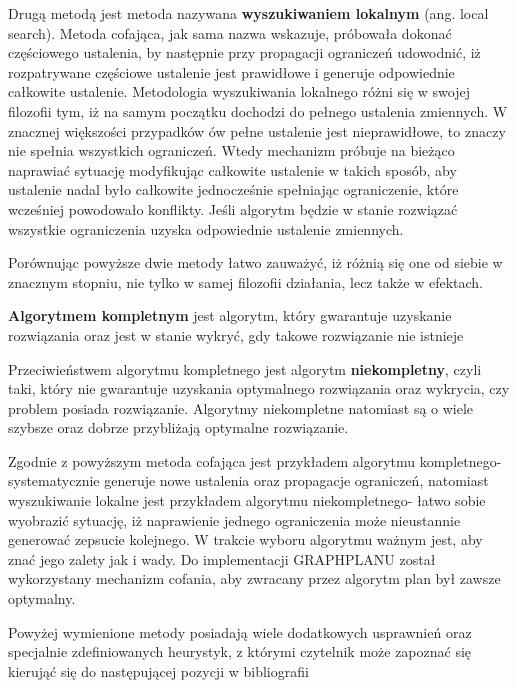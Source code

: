     Drugą metodą jest metoda nazywana \textbf{wyszukiwaniem lokalnym} (ang. local search). Metoda cofająca, jak sama nazwa wskazuje, próbowała dokonać 
    częściowego ustalenia, by następnie przy propagacji ograniczeń udowodnić, iż rozpatrywane częściowe ustalenie jest prawidłowe 
    i generuje odpowiednie całkowite ustalenie. Metodologia wyszukiwania lokalnego różni się w swojej filozofii tym, iż na samym 
    początku dochodzi do pełnego ustalenia zmiennych. W znacznej większości przypadków ów pełne ustalenie jest 
    nieprawidłowe, to znaczy nie spełnia wszystkich ograniczeń. Wtedy mechanizm próbuje na bieżąco naprawiać sytuację modyfikując całkowite ustalenie w takich 
    sposób, aby ustalenie nadal było całkowite jednocześnie spełniając ograniczenie, które wcześniej powodowało konflikty. Jeśli algorytm będzie w stanie 
    rozwiązać wszystkie ograniczenia uzyska odpowiednie ustalenie zmiennych.

    Porównując powyższe dwie metody łatwo zauważyć, iż różnią się one od siebie w znacznym stopniu, nie tylko w samej filozofii działania, lecz także 
    w efektach.

    \begin{definition}
        \label{AlgorytmKompletny}
        \textbf{Algorytmem kompletnym} jest algorytm, który gwarantuje uzyskanie rozwiązania oraz jest w stanie 
        wykryć, gdy takowe rozwiązanie nie istnieje
    \end{definition}

    Przeciwieństwem algorytmu kompletnego jest algorytm \textbf{niekompletny}, czyli taki, który nie gwarantuje 
    uzyskania optymalnego rozwiązania oraz wykrycia, czy problem posiada rozwiązanie. Algorytmy niekompletne natomiast są o wiele 
    szybsze oraz dobrze przybliżają optymalne rozwiązanie. 

    Zgodnie z powyższym metoda cofająca jest przykładem algorytmu kompletnego- systematycznie generuje nowe ustalenia oraz propagacje ograniczeń,
    natomiast wyszukiwanie lokalne jest przykładem algorytmu niekompletnego- łatwo sobie wyobrazić sytuację, iż naprawienie jednego ograniczenia 
    może nieustannie generować zepsucie kolejnego. W trakcie wyboru algorytmu ważnym jest, aby znać jego zalety jak i wady. Do implementacji 
    GRAPHPLANU został wykorzystany mechanizm cofania, aby zwracany przez algorytm plan był zawsze optymalny.



    Powyżej wymienione metody posiadają wiele dodatkowych usprawnień oraz specjalnie zdefiniowanych heurystyk,
    z którymi czytelnik może zapoznać się kierująć się do następującej pozycji w bibliografii \cite{CP}

